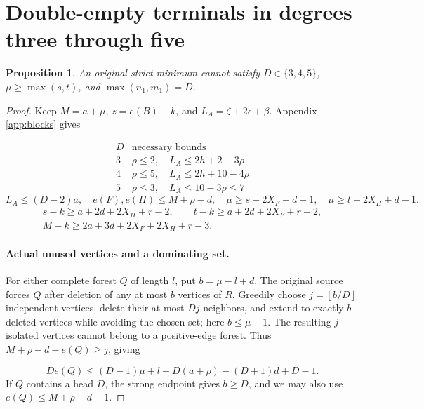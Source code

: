 \documentclass[11pt,a4paper]{article}
\newcommand{\floor}[1]{\left\lfloor#1\right\rfloor}
\newtheorem{proposition}[theorem]{Proposition}
\theoremstyle{definition}
\begin{document}
\section{Double-empty terminals in degrees three through five}\label{app:low-double}
\begin{proposition}\label{prop:low-double}
An original strict minimum cannot satisfy $D\in\{3,4,5\}$,
$\mu\ge\max(s,t)$, and $\max(n_1,m_1)=D$.
\end{proposition}
\begin{proof}
Keep $M=a+\mu$, $z=e(B)-k$, and $L_A=\zeta+2\epsilon+\beta$.
Appendix \ref{app:blocks} gives

\[
\begin{array}{c|c}
D&\text{necessary bounds}\\\hline
3&\rho\le2,\quad L_A\le2h+2-3\rho\\
4&\rho\le5,\quad L_A\le2h+10-4\rho\\
5&\rho\le3,\quad L_A\le10-3\rho\le7
\end{array}
\]
\[
L_A\le(D-2)a,\quad
e(F),e(H)\le M+\rho-d,\quad
\mu\ge s+2X_F+d-1,\quad\mu\ge t+2X_H+d-1.
\]
\begin{equation}\label{eq:low-double-guards}
\begin{gathered}
s-k\ge a+2d+2X_H+r-2,\qquad
t-k\ge a+2d+2X_F+r-2,\\
M-k\ge2a+3d+2X_F+2X_H+r-3.
\end{gathered}
\end{equation}

\paragraph{Actual unused vertices and a dominating set.}
For either complete forest $Q$ of length $l$, put $b=\mu-l+d$.
The original source forces $Q$ after deletion of any at most $b$ vertices of $R$.
Greedily choose $j=\floor{b/D}$ independent vertices, delete their at most $Dj$ neighbors, and extend to exactly $b$ deleted vertices while avoiding the chosen set; here $b\le\mu-1$.
The resulting $j$ isolated vertices cannot belong to a positive-edge forest.
Thus $M+\rho-d-e(Q)\ge j$, giving

\begin{equation}\label{eq:robust-mass}
 D e(Q)\le(D-1)\mu+l+D(a+\rho)-(D+1)d+D-1.
\end{equation}
If $Q$ contains a head $D$, the strong endpoint gives $b\ge D$, and we may also use
$e(Q)\le M+\rho-d-1$.


\end{proof}
\end{document}
